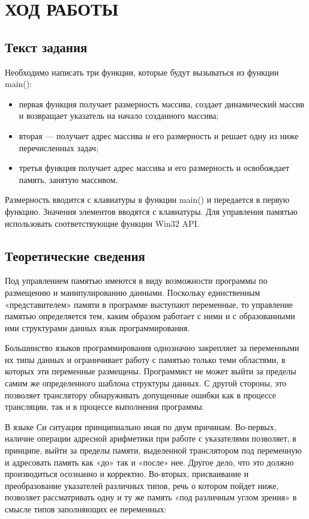 \section{ХОД РАБОТЫ}

\subsection{Текст задания}

Необходимо написать три функции, которые будут
вызываться из функции main():
\begin{itemize}
\item
  первая функция получает размерность
  массива, создает динамический массив и возвращает указатель на начало
  созданного массива;
\item
  вторая --- получает адрес массива и его размерность
  и решает одну из ниже перечисленных задач;
\item
  третья функция получает
  адрес массива и его размерность и освобождает память, занятую
  массивом.
\end{itemize}

Размерность вводится с клавиатуры в функции main() и
передается в первую функцию. 
Значения элементов вводятся с клавиатуры.
Для управления памятью использовать соответствующие функции Win32 API.

\subsection{Теоретические сведения}

Под управлением памятью имеются в виду возможности программы по размещению и манипулированию данными. Поскольку единственным «представителем» памяти в программе выступают переменные, то управление памятью определяется тем, каким образом работает с ними и с образованными ими структурами данных язык программирования. 

Большинство языков программирования однозначно закрепляет за переменными их типы данных и ограничивает работу с памятью только теми областями, в которых эти переменные размещены. Программист не может выйти за пределы самим же определенного шаблона структуры данных. С другой стороны, это позволяет транслятору обнаруживать допущенные ошибки как в процессе трансляции, так и в процессе выполнения программы. 

В языке Си ситуация принципиально иная по двум причинам. Во-первых, наличие операции адресной арифметики при работе с указателями позволяет, в принципе, выйти за пределы памяти, выделенной транслятором под переменную и адресовать память как «до» так и «после» нее. Другое дело, что это должно производиться осознанно и корректно. Во-вторых, присваивание и преобразование указателей различных типов, речь о котором пойдет ниже, позволяет рассматривать одну и ту же память «под различным углом зрения» в смысле типов заполняющих ее переменных:

